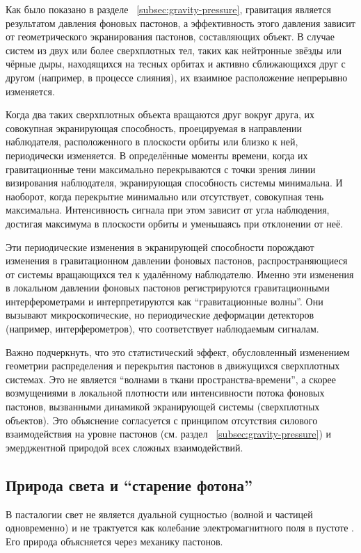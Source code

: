 \documentclass[pdflatex,sn-mathphys-num]{sn-jnl}
\begin{document}
Как было показано в разделе ~\ref{subsec:gravity-pressure}, гравитация является результатом давления фоновых пастонов, а эффективность этого давления зависит от геометрического экранирования пастонов, составляющих объект. В случае систем из двух или более сверхплотных тел, таких как нейтронные звёзды или чёрные дыры, находящихся на тесных орбитах и активно сближающихся друг с другом (например, в процессе слияния), их взаимное расположение непрерывно изменяется.

Когда два таких сверхплотных объекта вращаются друг вокруг друга, их совокупная экранирующая способность, проецируемая в направлении наблюдателя, расположенного в плоскости орбиты или близко к ней, периодически изменяется. В определённые моменты времени, когда их гравитационные тени максимально перекрываются с точки зрения линии визирования наблюдателя, экранирующая способность системы минимальна. И наоборот, когда перекрытие минимально или отсутствует, совокупная тень максимальна. Интенсивность сигнала при этом зависит от угла наблюдения, достигая максимума в плоскости орбиты и уменьшаясь при отклонении от неё.

Эти периодические изменения в экранирующей способности порождают изменения в гравитационном давлении фоновых пастонов, распространяющиеся от системы вращающихся тел к удалённому наблюдателю. Именно эти изменения в локальном давлении фоновых пастонов регистрируются гравитационными интерферометрами и интерпретируются как ``гравитационные волны''. Они вызывают микроскопические, но периодические деформации детекторов (например, интерферометров), что соответствует наблюдаемым сигналам.

Важно подчеркнуть, что это статистический эффект, обусловленный изменением геометрии распределения и перекрытия пастонов в движущихся сверхплотных системах. Это не является ``волнами в ткани пространства-времени'', а скорее возмущениями в локальной плотности или интенсивности потока фоновых пастонов, вызванными динамикой экранирующей системы (сверхплотных объектов). Это объяснение согласуется с принципом отсутствия силового взаимодействия на уровне пастонов (см. раздел ~\ref{subsec:gravity-pressure}) и эмерджентной природой всех сложных взаимодействий.

\subsection{Природа света и ``старение фотона''}\label{subsec:light-aging}

В пасталогии свет не является дуальной сущностью (волной и частицей одновременно) \cite{debroglie1924-thesis} и не трактуется как колебание электромагнитного поля в пустоте \cite{maxwell1873-treatise}. Его природа объясняется через механику пастонов. 
\end{document}
